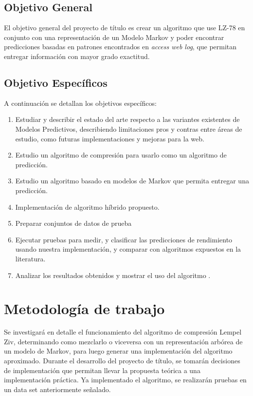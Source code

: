 \documentclass{udparticle}
\begin{document}
\subsection{Objetivo General}
 
El objetivo general del proyecto de título es crear un algoritmo que use LZ-78 en conjunto con una representación de un Modelo Markov y  poder encontrar predicciones basadas en patrones encontrados en \emph{access web log}, que permitan entregar información con mayor grado exactitud.
 
\subsection{Objetivo  Específicos }
 
A continuación se detallan los objetivos específicos:
 
\begin{enumerate}
  \item Estudiar y describir el estado del arte respecto a las variantes existentes de Modelos Predictivos, describiendo limitaciones pros y contras entre áreas de estudio, como futuras implementaciones y mejoras para la web.
  \item Estudio un algoritmo de compresión para usarlo como un algoritmo de predicción.
  \item Estudio un algoritmo basado en modelos de Markov que permita entregar una predicción.
  \item Implementación de algoritmo híbrido propuesto.
  \item Preparar conjuntos de datos de prueba 
  \item Ejecutar pruebas para medir, y clasificar las predicciones de rendimiento usando nuestra implementación, y comparar con algoritmos expuestos en la literatura.
  \item Analizar los resultados obtenidos y mostrar el uso del algoritmo .
\end{enumerate}


\section{Metodología de trabajo}

Se investigará en detalle el funcionamiento del algoritmo de compresión Lempel Ziv, determinando como mezclarlo o viceversa con un representación arbórea de un modelo de Markov, para luego generar una implementación del algoritmo aproximado.
Durante el desarrollo del proyecto de título, se tomarán decisiones de implementación que permitan llevar la propuesta teórica a una implementación práctica. Ya implementado el algoritmo, se realizarán pruebas en un data set anteriormente señalado.
\end{document}

